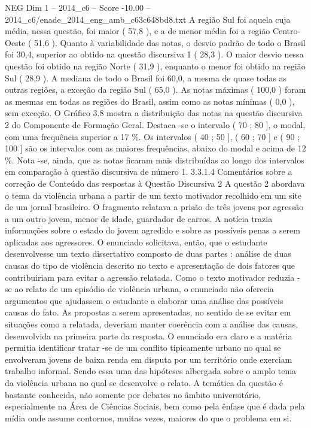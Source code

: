\begin{textsample}{NEG Dim 1 – 2014\_c6 – Score -10.00 – 2014\_c6/enade\_2014\_eng\_amb\_c63c648bd8.txt}
A região Sul foi aquela cuja média, nessa questão, foi maior ( 57,8 ), e a de menor média foi a região Centro-Oeste ( 51,6 ).
Quanto à variabilidade das notas, o desvio padrão de todo o Brasil foi 30,4, superior ao obtido na questão discursiva 1 ( 28,3 ).
O maior desvio nessa questão foi obtido na região Norte ( 31,9 ), enquanto o menor foi obtido na região Sul ( 28,9 ).
A mediana de todo o Brasil foi 60,0, a mesma de quase todas as outras regiões, a exceção da região Sul ( 65,0 ).
As notas máximas ( 100,0 ) foram as mesmas em todas as regiões do Brasil, assim como as notas mínimas ( 0,0 ), sem exceção.
O Gráfico 3.8 mostra a distribuição das notas na questão discursiva 2 do Componente de Formação Geral.
Destaca -se o intervalo ( 70 ; 80 ], o modal, com uma frequência superior a 17 \%.
Os intervalos ( 40 ; 50 ], ( 60 ; 70 ] e ( 90 ; 100 ] são os intervalos com as maiores frequências, abaixo do modal e acima de 12 \%.
Nota -se, ainda, que as notas ficaram mais distribuídas ao longo dos intervalos em comparação à questão discursiva de número 1. 3.3.1.4 Comentários sobre a correção de Conteúdo das respostas à Questão Discursiva 2 A questão 2 abordava o tema da violência urbana a partir de um texto motivador recolhido em um site de um jornal brasileiro.
O fragmento relatava a prisão de três jovens por agressão a um outro jovem, menor de idade, guardador de carros.
A notícia trazia informações sobre o estado do jovem agredido e sobre as possíveis penas a serem aplicadas aos agressores.
O enunciado solicitava, então, que o estudante desenvolvesse um texto dissertativo composto de duas partes : análise de duas causas do tipo de violência descrito no texto e apresentação de dois fatores que contribuiriam para evitar a agressão relatada.
Como o texto motivador reduzia -se ao relato de um episódio de violência urbana, o enunciado não oferecia argumentos que ajudassem o estudante a elaborar uma análise das possíveis causas do fato.
As propostas a serem apresentadas, no sentido de se evitar em situações como a relatada, deveriam manter coerência com a análise das causas, desenvolvida na primeira parte da resposta.
O enunciado era claro e a matéria permitia identificar tratar -se de um conflito tipicamente urbano no qual se envolveram jovens de baixa renda em disputa por um território onde exerciam trabalho informal.
Sendo essa uma das hipóteses albergada sobre o amplo tema da violência urbana no qual se desenvolve o relato.
A temática da questão é bastante conhecida, não somente por debates no âmbito universitário, especialmente na Área de Ciências Sociais, bem como pela ênfase que é dada pela mídia onde assume contornos, muitas vezes, maiores do que o problema em si.

\end{textsample}
